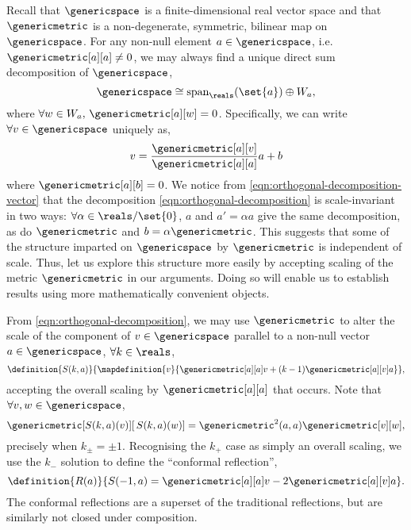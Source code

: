 \documentclass{article}
\begin{document}
Recall that $\genericspace$ is a finite-dimensional real vector space and that $\genericmetric$ is a non-degenerate, symmetric, bilinear map on $\genericspace$. For any non-null element $a\in\genericspace$, i.e. $\genericmetric[a][a]\neq0$, we may always find a unique direct sum decomposition of $\genericspace$,
\begin{equation}\label{eqn:orthogonal-decomposition}
    \genericspace\cong\textup{span}_{\reals}(\set{a})\oplus W_{a},
\end{equation}
\noindent where $\forall w\in W_{a},\,\genericmetric[a][w]=0$. Specifically, we can write $\forall v\in\genericspace$ uniquely as,
\begin{equation}\label{eqn:orthogonal-decomposition-vector}
    v=\frac{\genericmetric[a][v]}{\genericmetric[a][a]}a+b
\end{equation}
\noindent where $\genericmetric[a][b]=0$. We notice from \eqref{eqn:orthogonal-decomposition-vector} that the decomposition \eqref{eqn:orthogonal-decomposition} is scale-invariant in two ways: $\forall\alpha\in\reals/\set{0}$, $a$ and $a'=\alpha a$ give the same decomposition, as do $\genericmetric$ and $b=\alpha\genericmetric$. This suggests that some of the structure imparted on $\genericspace$ by $\genericmetric$ is independent of scale. Thus, let us explore this structure more easily by accepting scaling of the metric $\genericmetric$ in our arguments. Doing so will enable us to establish results using more mathematically convenient objects.

From \eqref{eqn:orthogonal-decomposition}, we may use $\genericmetric$ to alter the scale of the component of $v\in\genericspace$ parallel to a non-null vector $a\in\genericspace$, $\forall k\in\reals$,
\begin{equation}\label{eqn:component-scale-map}
    \definition{S(k,a)}{\mapdefinition{v}{\genericmetric[a][a]v+(k-1)\genericmetric[a][v]a}},
\end{equation} 
\noindent accepting the overall scaling by $\genericmetric[a][a]$ that occurs. Note that $\forall v,w\in\genericspace$,
\begin{equation}
    \genericmetric[S(k,a)(v)][\,S(k,a)(w)]=\genericmetric^{2}(a,a)\genericmetric[v][w],
\end{equation} 
\noindent precisely when $k_{\pm}=\pm1$. Recognising the $k_{+}$ case as simply an overall scaling, we use the $k_{-}$ solution to define the \enquote{conformal reflection},
\begin{equation}
    \definition{R(a)}{S(-1,a)=\genericmetric[a][a]v-2\genericmetric[a][v]a}.
\end{equation}
\noindent The conformal reflections are a superset of the traditional reflections, but are similarly not closed under composition.
\end{document}
